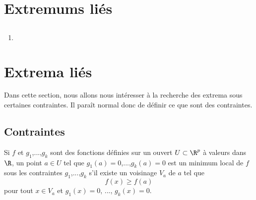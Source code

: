 \documentclass[12pt, class=report,crop=false]{standalone}
\begin{document}
{{{%
\section{Extremums liés}

\subsection{}


\subsection{}


\subsection{}


\subsection{}
 
 
\begin{miniexercices}
\sauteligne
\begin{enumerate}
  \item 
\end{enumerate}
\end{miniexercices}

\section{Extrema li\'es}


\noindent Dans cette section, nous allons nous intéresser à la recherche des extrema sous certaines contraintes. Il paraît normal donc de
définir ce que sont des contraintes. 

\subsection{Contraintes}
\begin{definition}[CONTRAINTES]
\textcolor[rgb]{0.98,0.00,0.00}{
  Si $f$ et $g_1$,...,$g_k$ sont des fonctions d\'efinies sur un ouvert $U \subset \R^p$ \`a valeurs dans $\R$, un point $a \in U$ tel que $g_1(a)=0$,...,$g_k(a)=0$
est un minimum local de $f$ sous les contraintes $g_1$,...,$g_k$ s'il existe un voisinage $V_a$ de $a$
tel que
\begin{equation*}
  f(x) \geq f(a)
\end{equation*}
pour tout $x \in V_a$ et $g_1(x)=0$, ..., $g_k(x)=0$.}
\end{definition}


}}}
\end{document}
